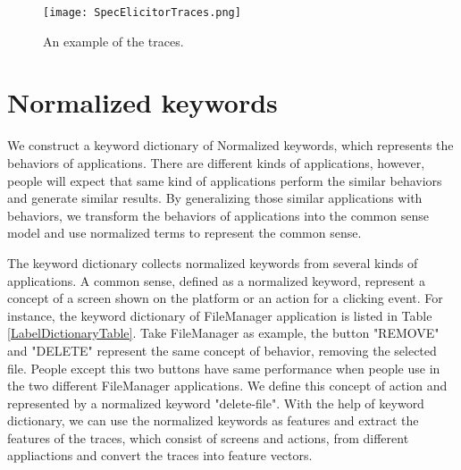 \begin{figure}[ht]
	\graphicspath{{pic/}}
	\begin{center}
		\texttt{[image: SpecElicitorTraces.png]}
		\caption{ An example of the traces.  }
		\label{SpecElicitorTraces}
	\end{center}
\end{figure}

\clearpage

\section{Normalized keywords}

We construct a keyword dictionary of Normalized keywords, which represents the behaviors of applications.
There are different kinds of applications, however,
people will expect that same kind of applications perform the similar behaviors and generate similar results.
By generalizing those similar applications with behaviors,
we transform the behaviors of applications into the common sense model and use normalized terms to represent the common sense.

The keyword dictionary collects normalized keywords from several kinds of applications.
A common sense, defined as a normalized keyword, represent a concept of a screen shown on the platform or an action for a clicking event.
For instance, the keyword dictionary of FileManager application is listed in Table \ref{LabelDictionaryTable}.
Take FileManager as example, the button "REMOVE" and "DELETE" represent the same concept of behavior, removing the selected file.
People except this two buttons have same performance when people use in the two different FileManager applications.
We define this concept of action and represented by a normalized keyword "delete-file".
With the help of keyword dictionary,
we can use the normalized keywords as features and extract the features of the traces, 
which consist of screens and actions, from different appliactions and convert the traces into feature vectors.


